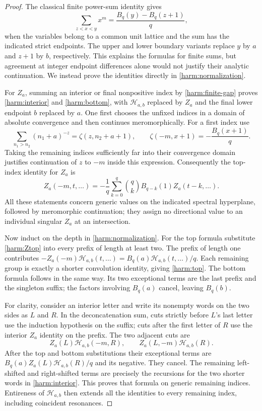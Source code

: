 \documentclass[11pt,a4paper]{article}
\numberwithin{equation}{section}
\theoremstyle{definition}
\theoremstyle{remark}
\begin{document}
\begin{proof}
The classical finite power-sum identity \cite{DLMF} gives
\begin{equation}
 \sum_{z<x<y}x^m=\frac{B_q(y)-B_q(z+1)}q,
 \label{harm:finite-gap}
\end{equation}
when the variables belong to a common unit lattice and the sum has the
indicated strict endpoints. The upper and lower boundary variants
replace $y$ by $a$ and $z+1$ by $b$, respectively. This explains the
formulas for finite sums, but agreement at integer endpoint differences
alone would not justify their analytic continuation. We instead prove
the identities directly in \eqref{harm:normalization}.

For $Z_a$, summing an interior or final nonpositive index by
\eqref{harm:finite-gap} proves \eqref{harm:interior} and
\eqref{harm:bottom}, with $\mathcal H_{a,b}$ replaced by $Z_a$ and
the final lower endpoint $b$ replaced by $a$. One first chooses the
unfixed indices in a domain of absolute convergence and then continues
meromorphically. For a first index use
\[
 \sum_{n_1>n_2}(n_1+a)^{-z}
                   =\zeta(z,n_2+a+1),\qquad
 \zeta(-m,x+1)=-\frac{B_q(x+1)}q.
\]
Taking the remaining indices sufficiently far into their convergence
domain justifies continuation of $z$ to $-m$ inside this expression.
Consequently the top-index identity for $Z_a$ is
\begin{equation}
 Z_a(-m,t,\ldots)
   =-\frac1q\sum_{k=0}^q\binom qk B_{q-k}(1)
                               Z_a(t-k,\ldots).
 \label{harm:Ztop}
\end{equation}
All these statements concern generic values on the indicated spectral
hyperplane, followed by meromorphic continuation; they assign no
directional value to an individual singular $Z_a$ at an intersection.

Now induct on the depth in \eqref{harm:normalization}. For the top
formula substitute \eqref{harm:Ztop} into every prefix of length at
least two. The prefix of length one contributes
$-Z_a(-m)\mathcal H_{a,b}(t,\ldots)
 =B_q(a)\mathcal H_{a,b}(t,\ldots)/q$.
Each remaining group is exactly a shorter convolution identity, giving
\eqref{harm:top}. The bottom formula follows in the same way. Its
two exceptional terms are the last prefix and the singleton suffix;
the factors involving $B_q(a)$ cancel, leaving $B_q(b)$.

For clarity, consider an interior letter and write its nonempty words
on the two sides as $L$ and $R$. In the deconcatenation sum, cuts
strictly before $L$'s last letter use the induction hypothesis on the
suffix; cuts after the first letter of $R$ use the interior $Z_a$
identity on the prefix. The two adjacent cuts are
\[
 Z_a(L)\mathcal H_{a,b}(-m,R),\qquad
 Z_a(L,-m)\mathcal H_{a,b}(R).
\]
After the top and bottom substitutions their exceptional terms are
$B_q(a)Z_a(L)\mathcal H_{a,b}(R)/q$ and its negative.
They cancel. The remaining left-shifted and right-shifted terms are
precisely the recursions for the two shorter words in
\eqref{harm:interior}. This proves that formula on generic remaining
indices. Entireness of $\mathcal H_{a,b}$ then extends all the
identities to every remaining index, including coincident resonances.
\end{proof}
\end{document}
